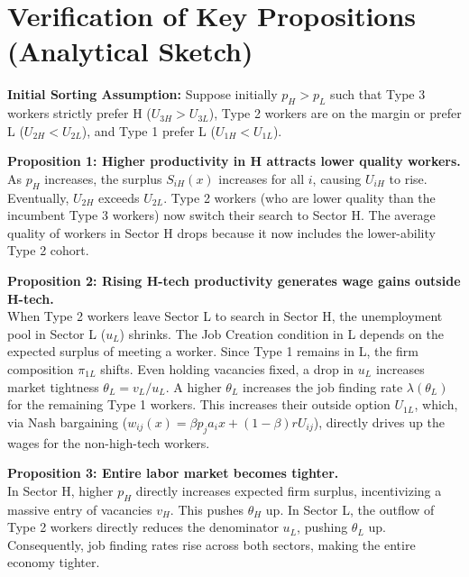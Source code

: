 \documentclass[11pt]{article}
\begin{document}
\section{Verification of Key Propositions (Analytical Sketch)}

\textbf{Initial Sorting Assumption:} Suppose initially $p_H > p_L$ such that Type 3 workers strictly prefer H ($U_{3H} > U_{3L}$), Type 2 workers are on the margin or prefer L ($U_{2H} < U_{2L}$), and Type 1 prefer L ($U_{1H} < U_{1L}$).

\textbf{Proposition 1: Higher productivity in H attracts lower quality workers.}\\
As $p_H$ increases, the surplus $S_{iH}(x)$ increases for all $i$, causing $U_{iH}$ to rise. Eventually, $U_{2H}$ exceeds $U_{2L}$. Type 2 workers (who are lower quality than the incumbent Type 3 workers) now switch their search to Sector H. The average quality of workers in Sector H drops because it now includes the lower-ability Type 2 cohort.

\textbf{Proposition 2: Rising H-tech productivity generates wage gains outside H-tech.}\\
When Type 2 workers leave Sector L to search in Sector H, the unemployment pool in Sector L ($u_L$) shrinks. The Job Creation condition in L depends on the expected surplus of meeting a worker. Since Type 1 remains in L, the firm composition $\pi_{1L}$ shifts. Even holding vacancies fixed, a drop in $u_L$ increases market tightness $\theta_L = v_L / u_L$. A higher $\theta_L$ increases the job finding rate $\lambda(\theta_L)$ for the remaining Type 1 workers. This increases their outside option $U_{1L}$, which, via Nash bargaining ($w_{ij}(x) = \beta p_j a_i x + (1-\beta)r U_{ij}$), directly drives up the wages for the non-high-tech workers.

\textbf{Proposition 3: Entire labor market becomes tighter.}\\
In Sector H, higher $p_H$ directly increases expected firm surplus, incentivizing a massive entry of vacancies $v_H$. This pushes $\theta_H$ up. In Sector L, the outflow of Type 2 workers directly reduces the denominator $u_L$, pushing $\theta_L$ up. Consequently, job finding rates rise across both sectors, making the entire economy tighter.
\end{document}
